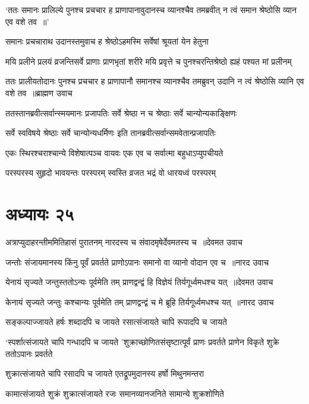 \threelineshloka
{`ततः समानः प्रालिल्ये पुनश्च प्रचचार ह}
{प्राणापानावुदानस्च व्यानश्चैव तमब्रवीत्}
{न त्वं समान श्रेष्ठोसि व्यान एव वशे तव ॥'}


\twolineshloka
{समानः प्रचचाराथ उदानस्तमुवाच ह}
{श्रेष्ठोऽहमस्मि सर्वेषां श्रूयतां येन हेतुना}


\twolineshloka
{मयि प्रलीने प्रलयं व्रजन्तिसर्वे प्राणाः प्राणभृतां शरीरे}
{मयि प्रवृत्ते च पुनश्चरन्तिश्रेष्ठो ह्यहं पश्यत मां प्रलीनम्}


\fourlineindentedshloka
{ततः प्रालीयतोदानः पुनश्च प्रचचार ह}
{प्राणापानौ समानश्च व्यानश्चैव तमब्रुवन्}
{उदानि न त्वं श्रेष्ठोसि व्यानि एव वशे तव ॥ब्राह्मण उवाच}
{}


\twolineshloka
{ततस्तानब्रवीत्सर्वान्स्मयमानः प्रजापतिः}
{सर्वे श्रेष्ठा न च श्रेष्ठाः सर्वे चान्योन्यकाङ्क्षिणः}


\twolineshloka
{सर्वे स्वविषये श्रेष्ठाः सर्वे चान्योन्यधर्मिणः}
{इति तानब्रवीत्सर्वान्समवेतान्प्रजापतिः}


\twolineshloka
{एकः स्थिरश्चराश्चान्ये विशेषात्पञ्च वायवः}
{एक एव च सर्वात्मा बहुधाऽप्युपचीयते}


\twolineshloka
{परस्परस्य सुहृदो भावयन्तः परस्परम्}
{स्वस्ति व्रजत भद्रं वो धारयध्वं परस्परम्}


\chapter{अध्यायः २५}
\threelineshloka
{अत्राप्युदाहरन्तीममितिहासं पुरातनम्}
{नारदस्य च संवादमृषेर्देवमतस्य च ॥देवमत उवाच}
{}


\threelineshloka
{जन्तोः संजायमानस्य किंनु पूर्वं प्रवर्तते}
{प्राणोऽपानः समानो वा व्यानो वोदान एव च ॥नारद उवाच}
{}


\threelineshloka
{येनायं सृज्यते जन्तुस्ततोऽन्यः पूर्वमेति तम्}
{प्राणद्वन्द्वं हि विज्ञेयं तिर्यगूर्ध्वमधश्च यत् ॥देवमत उवाच}
{}


\threelineshloka
{केनायं सृज्यते जन्तुः कश्चान्यः पूर्वमेति तम्}
{प्राणद्वन्द्वं च मे ब्रूहि तिर्यगूर्ध्वमधश्च यत् ॥नारद उवाच}
{}


\twolineshloka
{सङ्कल्पाज्जायते हर्षः शब्दादपि च जायते}
{रसात्संजायते चापि रूपादपि च जायते}


\threelineshloka
{`स्पर्शात्संजायते चापि गन्धादपि च जायते}
{'शुक्राच्छोणितसंसृष्टात्पूर्वं प्राणः प्रवर्तते}
{प्राणेन विकृते शुक्रे ततोऽपानः प्रवर्तते}


\twolineshloka
{शुक्रात्संजायते चापि रसादपि च जायते}
{एतद्रूपमुदानस्य हर्षो मिथुनमन्तरा}


\twolineshloka
{कामात्संजायते शुक्रं शुक्रात्संजायते रजः}
{समानव्यानजनिते सामान्ये शुक्रशोणिते}


